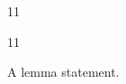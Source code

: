 \documentclass[paper=A4]{ropas-poster}
\begin{document}
\begin{postergrid}{1}{1}
\begin{posterblock}{1}{1}
\begin{lemma}A lemma statement.\end{lemma}
\end{posterblock}
\end{postergrid}
\end{document}
